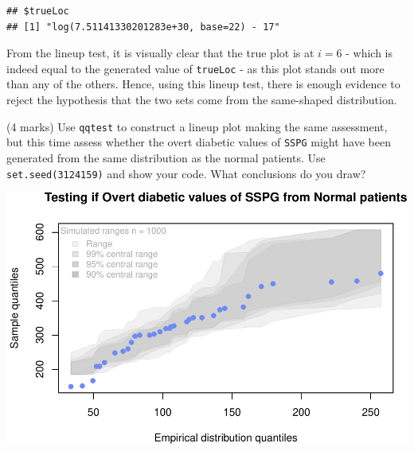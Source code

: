 \documentclass[9pt,letter]{article}
\newenvironment{Shaded}{\begin{snugshade}}{\end{snugshade}}
\newcommand{\KeywordTok}[1]{\textcolor[rgb]{0.13,0.29,0.53}{\textbf{#1}}}
\newcommand{\DataTypeTok}[1]{\textcolor[rgb]{0.13,0.29,0.53}{#1}}
\newcommand{\DecValTok}[1]{\textcolor[rgb]{0.00,0.00,0.81}{#1}}
\newcommand{\StringTok}[1]{\textcolor[rgb]{0.31,0.60,0.02}{#1}}
\newcommand{\CommentTok}[1]{\textcolor[rgb]{0.56,0.35,0.01}{\textit{#1}}}
\newcommand{\OperatorTok}[1]{\textcolor[rgb]{0.81,0.36,0.00}{\textbf{#1}}}
\newcommand{\NormalTok}[1]{#1}
\begin{document}
\begin{verbatim}
## $trueLoc
## [1] "log(7.51141330201283e+30, base=22) - 17"
\end{verbatim}

From the lineup test, it is visually clear that the true plot is at
\(i = 6\) - which is indeed equal to the generated value of
\texttt{trueLoc} - as this plot stands out more than any of the others.
Hence, using this lineup test, there is enough evidence to reject the
hypothesis that the two sets come from the same-shaped distribution.

\item 

(4 marks) Use \texttt{qqtest} to construct a lineup plot making the same
assessment, but this time assess whether the overt diabetic values of
\texttt{SSPG} might have been generated from the same distribution as
the normal patients. Use \texttt{set.seed(3124159)} and show your code.
What conclusions do you draw?

\begin{Shaded}
\end{Shaded}

\includegraphics{a4_testing_files/figure-latex/unnamed-chunk-7-1.pdf}
\end{document}
